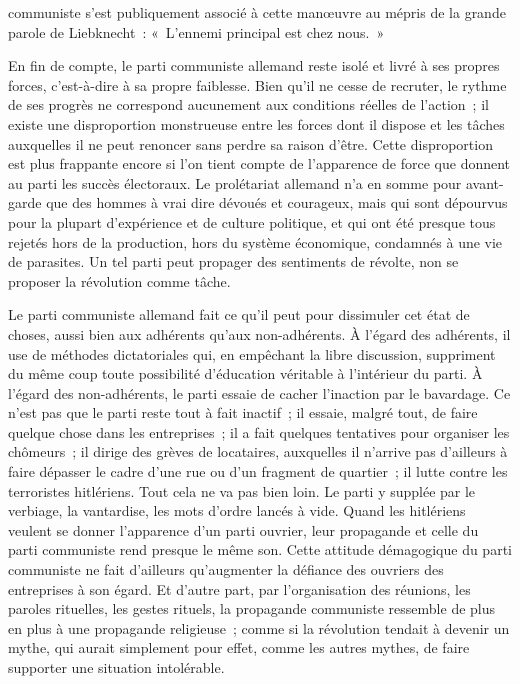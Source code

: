 \documentclass[french,twoside]{book} %
\begin{document}
communiste s'est publiquement associé à cette manœuvre au mépris de la grande parole de Liebknecht : « L'ennemi principal est chez nous. »\par
En fin de compte, le parti communiste allemand reste isolé et livré à ses propres forces, c'est-à-dire à sa propre faiblesse. Bien qu'il ne cesse de recruter, le rythme de ses progrès ne correspond aucunement aux conditions réelles de l'action ; il existe une disproportion monstrueuse entre les forces dont il dispose et les tâches auxquelles il ne peut renoncer sans perdre sa raison d'être. Cette disproportion est plus frappante encore si l'on tient compte de l'apparence de force que donnent au parti les succès électoraux. Le prolétariat allemand n'a en somme pour avant-garde que des hommes à vrai dire dévoués et courageux, mais qui sont dépourvus pour la plupart d'expé­rience et de culture politique, et qui ont été presque tous rejetés hors de la production, hors du système économique, condamnés à une vie de parasites. Un tel parti peut propager des sentiments de révolte, non se proposer la révolution comme tâche.\par
Le parti communiste allemand fait ce qu'il peut pour dissimuler cet état de choses, aussi bien aux adhérents qu'aux non-adhérents. À l'égard des adhé­rents, il use de méthodes dictatoriales qui, en empêchant la libre discussion, suppriment du même coup toute possibilité d'éducation véritable à l'intérieur du parti. À l'égard des non-adhérents, le parti essaie de cacher l'inaction par le bavardage. Ce n'est pas que le parti reste tout à fait inactif ; il essaie, malgré tout, de faire quelque chose dans les entreprises ; il a fait quelques tentatives pour organiser les chômeurs ; il dirige des grèves de locataires, auxquelles il n'arrive pas d'ailleurs à faire dépasser le cadre d'une rue ou d'un fragment de quartier ; il lutte contre les terroristes hitlériens. Tout cela ne va pas bien loin. Le parti y supplée par le verbiage, la vantardise, les mots d'ordre lancés à vide. Quand les hitlériens veulent se donner l'apparence d'un parti ouvrier, leur propagande et celle du parti communiste rend presque le même son. Cette attitude démagogique du parti communiste ne fait d'ailleurs qu'augmenter la défiance des ouvriers des entreprises à son égard. Et d'autre part, par l'orga­nisation des réunions, les paroles rituelles, les gestes rituels, la propagande communiste ressemble de plus en plus à une propagande religieuse ; comme si la révolution tendait à devenir un mythe, qui aurait simplement pour effet, comme les autres mythes, de faire supporter une situation intolérable.\par
\end{document}
